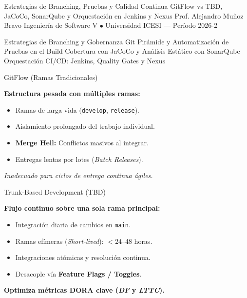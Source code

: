 \documentclass[aspectratio=169]{beamer}
\begin{document}
\titleSlideDarkMode
  {Estrategias de Branching, Pruebas y Calidad Continua}
  {GitFlow vs TBD, JaCoCo, SonarQube y Orquestación en Jenkins y Nexus}
  {Prof. Alejandro Muñoz Bravo}
  {Ingeniería de Software V $\bullet$ Universidad ICESI — Período 2026-2}

  {Estrategias de Branching y Gobernanza Git}
  {Pirámide y Automatización de Pruebas en el Build}
  {Cobertura con JaCoCo y Análisis Estático con SonarQube}
  {Orquestación CI/CD: Jenkins, Quality Gates y Nexus}


  {GitFlow (Ramas Tradicionales)}
  {
    {\footnotesize
    \textbf{Estructura pesada con múltiples ramas:}
    \begin{itemize}
      \setlength{\itemsep}{1.5pt}
      \setlength{\topsep}{1pt}
      \item Ramas de larga vida (\texttt{develop}, \texttt{release}).
      \item Aislamiento prolongado del trabajo individual.
      \item \textbf{Merge Hell:} Conflictos masivos al integrar.
      \item Entregas lentas por lotes (\textit{Batch Releases}).
    \end{itemize}
    \vspace{0.15cm}
    \textit{Inadecuado para ciclos de entrega continua ágiles.}
    }
  }
  {Trunk-Based Development (TBD)}
  {
    {\footnotesize
    \textbf{Flujo continuo sobre una sola rama principal:}
    \begin{itemize}
      \setlength{\itemsep}{1.5pt}
      \setlength{\topsep}{1pt}
      \item Integración diaria de cambios en \texttt{main}.
      \item Ramas efímeras (\textit{Short-lived}): $< 24$--48 horas.
      \item Integraciones atómicas y resolución continua.
      \item Desacople vía \textbf{Feature Flags / Toggles}.
    \end{itemize}
    \vspace{0.15cm}
    \textbf{Optimiza métricas DORA clave (\textit{DF} y \textit{LTTC}).}
    }
  }
\end{document}

